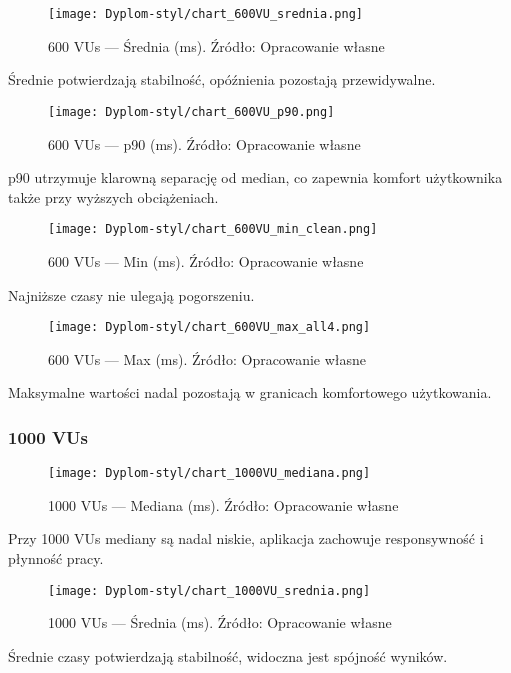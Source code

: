 \begin{figure}[H]\centering
\texttt{[image: Dyplom-styl/chart\_600VU\_srednia.png]}
\caption{600 VUs --- Średnia (ms). Źródło: Opracowanie własne}\label{fig:600-srednia}
\end{figure}
Średnie potwierdzają stabilność, opóźnienia pozostają przewidywalne.

\begin{figure}[H]\centering
\texttt{[image: Dyplom-styl/chart\_600VU\_p90.png]}
\caption{600 VUs --- p90 (ms). Źródło: Opracowanie własne}\label{fig:600-p90}
\end{figure}
p90 utrzymuje klarowną separację od median, co zapewnia komfort użytkownika także przy wyższych obciążeniach.

\begin{figure}[H]\centering
\texttt{[image: Dyplom-styl/chart\_600VU\_min\_clean.png]}
\caption{600 VUs --- Min (ms). Źródło: Opracowanie własne}\label{fig:600-min}
\end{figure}
Najniższe czasy nie ulegają pogorszeniu.

\begin{figure}[H]\centering
\texttt{[image: Dyplom-styl/chart\_600VU\_max\_all4.png]}
\caption{600 VUs --- Max (ms). Źródło: Opracowanie własne}\label{fig:600-max}
\end{figure}
Maksymalne wartości nadal pozostają w granicach komfortowego użytkowania.

\subsubsection{1000 VUs}

\begin{figure}[H]\centering
\texttt{[image: Dyplom-styl/chart\_1000VU\_mediana.png]}
\caption{1000 VUs --- Mediana (ms). Źródło: Opracowanie własne}\label{fig:1000-mediana}
\end{figure}
Przy 1000 VUs mediany są nadal niskie, aplikacja zachowuje responsywność i płynność pracy.

\begin{figure}[H]\centering
\texttt{[image: Dyplom-styl/chart\_1000VU\_srednia.png]}
\caption{1000 VUs --- Średnia (ms). Źródło: Opracowanie własne}\label{fig:1000-srednia}
\end{figure}
Średnie czasy potwierdzają stabilność, widoczna jest spójność wyników.

